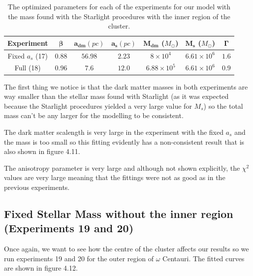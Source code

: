 \begin{table}[H]
\centering
\begin{tabular}{| c| c| c| c| c| c| c|}
    \hline
    \textbf{Experiment} & $\mathbf{\beta}$ & $\mathbf{a_{dm}} (pc)$ & $\mathbf{a_{s}} (pc)$ & $\mathbf{M_{dm}}$ ($M_{\odot}$) & $\mathbf{M_{s}}$ ($M_{\odot}$) & $\mathbf{\Gamma}$\\ \hline
	Fixed $a_s$ (17) &	$0.88$ &	$56.98$ &	$\mathbf{2.23}$ &	$8 \times 10^{4}$ &	$6.61 \times 10 ^{6}$ &	$1.6$\\ \hline
	Full (18) &	$0.96$ &	$7.6$ &	$12.0$ &	$6.88 \times 10^{5}$ &	$6.61 \times 10^{6}$ &	$0.9$\\ \hline
  \end{tabular} 
\caption[Optimized parameters for our model with the mass found with the Starlight procedures with the inner region.]{The optimized parameters for each of the experiments for our model with the mass found with the Starlight procedures with the inner region of the cluster.}
\end{table}

The first thing we notice is that the dark matter masses in both experiments are way smaller than the stellar mass found with Starlight (as it was expected because the Starlight procedures yielded a very large value for $M_s$) so the total mass can't be any larger for the modelling to be consistent. 

The dark matter scalength is very large in the experiment with the fixed $a_s$ and the mass is too small so this fitting evidently has a non-consistent result that is also shown in figure 4.11. 

The anisotropy parameter is very large and although not shown explicitly, the $\chi^{2}$ values are very large meaning that the fittings were not as good as in the previous experiments.

\subsection{Fixed Stellar Mass without the inner region (Experiments 19 and 20)}

Once again, we want to see how the centre of the cluster affects our results so we run experiments 19 and 20 for the outer region of $\omega$ Centauri. The fitted curves are shown in figure 4.12. 

